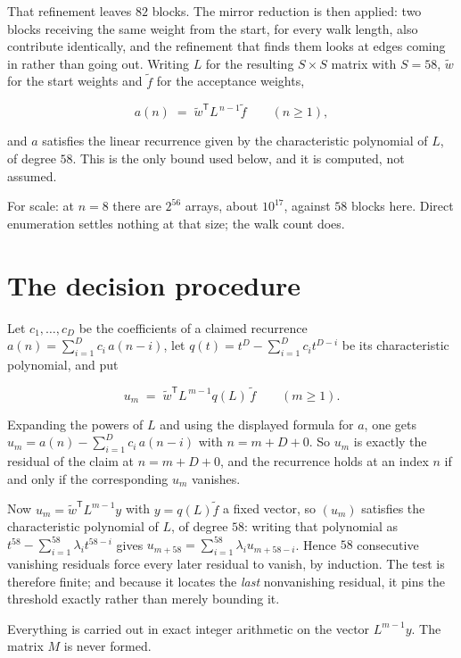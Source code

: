 \documentclass[11pt]{article}
\theoremstyle{definition}
\begin{document}
That refinement leaves $82$ blocks. The mirror reduction is then applied: two blocks receiving the same weight from the start, for every walk length, also contribute identically, and the refinement that finds them looks at edges coming in rather than going out. Writing $L$ for the resulting $S \times S$ matrix with $S = 58$, $\tilde w$ for the start weights and $\tilde f$ for the acceptance weights,

\[a(n) \;=\; \tilde w^{\mathsf T} L^{\,n-1} \tilde f \qquad (n \ge 1),\]

and $a$ satisfies the linear recurrence given by the characteristic polynomial of $L$, of degree $58$. This is the only bound used below, and it is computed, not assumed.

For scale: at $n = 8$ there are $2^{56}$ arrays, about $10^{17}$, against $58$ blocks here. Direct enumeration settles nothing at that size; the walk count does.

\section{The decision procedure}

Let $c_1,\dots,c_D$ be the coefficients of a claimed recurrence $a(n) = \sum_{i=1}^{D} c_i\,a(n-i)$, let $q(t) = t^{D} - \sum_{i=1}^{D} c_i t^{D-i}$ be its characteristic polynomial, and put

\[u_m \;=\; \tilde w^{\mathsf T} L^{\,m-1} q(L)\,\tilde f \qquad (m \ge 1).\]

Expanding the powers of $L$ and using the displayed formula for $a$, one gets $u_m = a(n) - \sum_{i=1}^{D} c_i\,a(n-i)$ with $n = m + D + 0$. So $u_m$ is exactly the residual of the claim at $n = m + D + 0$, and the recurrence holds at an index $n$ if and only if the corresponding $u_m$ vanishes.

Now $u_m = \tilde w^{\mathsf T} L^{m-1} y$ with $y = q(L)\tilde f$ a fixed vector, so $(u_m)$ satisfies the characteristic polynomial of $L$, of degree $58$: writing that polynomial as $t^{58} - \sum_{i=1}^{58} \lambda_i t^{58-i}$ gives $u_{m+58} = \sum_{i=1}^{58} \lambda_i u_{m+58-i}$. Hence $58$ consecutive vanishing residuals force every later residual to vanish, by induction. The test is therefore finite; and because it locates the {\itshape last} nonvanishing residual, it pins the threshold exactly rather than merely bounding it.

Everything is carried out in exact integer arithmetic on the vector $L^{m-1}y$. The matrix $M$ is never formed.
\end{document}
